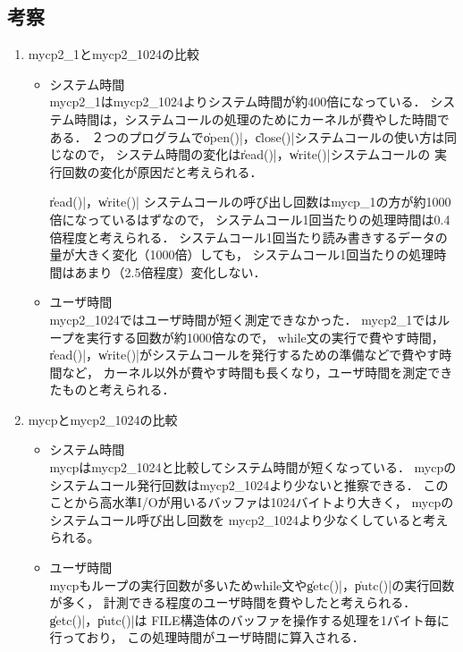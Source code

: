 \documentclass[a4j,twcolumn,11pt,nomag]{ltjarticle}      %
\begin{document}
\subsection*{考察}
\begin{enumerate}
  \item mycp2\_1とmycp2\_1024の比較
  \begin{itemize}
   \item システム時間 \\
   mycp2\_1はmycp2\_1024よりシステム時間が約400倍になっている．
   システム時間は，システムコールの処理のためにカーネルが費やした時間である．
   ２つのプログラムで\|open()|，\|close()|システムコールの使い方は同じなので，
   システム時間の変化は\|read()|，\|write()|システムコールの
   実行回数の変化が原因だと考えられる．

   \|read()|，\|write()|
   システムコールの呼び出し回数はmycp\_1の方が約1000倍になっているはずなので，
   システムコール1回当たりの処理時間は0.4倍程度と考えられる．
   システムコール1回当たり読み書きするデータの量が大きく変化（1000倍）しても，
   システムコール1回当たりの処理時間はあまり（2.5倍程度）変化しない．

   \item ユーザ時間 \\
   mycp2\_1024ではユーザ時間が短く測定できなかった．
   mycp2\_1ではループを実行する回数が約1000倍なので，
   while文の実行で費やす時間，
   \|read()|，\|write()|がシステムコールを発行するための準備などで費やす時間など，
   カーネル以外が費やす時間も長くなり，ユーザ時間を測定できたものと考えられる．
  \end{itemize}

  \item mycpとmycp2\_1024の比較
  \begin{itemize}
   \item システム時間 \\
   mycpはmycp2\_1024と比較してシステム時間が短くなっている．
   mycpのシステムコール発行回数はmycp2\_1024より少ないと推察できる．
   このことから高水準I/Oが用いるバッファは1024バイトより大きく，
   mycpのシステムコール呼び出し回数を
   mycp2\_1024より少なくしていると考えられる。

   \item ユーザ時間 \\
   mycpもループの実行回数が多いためwhile文や\|getc()|，\|putc()|の実行回数が多く，
   計測できる程度のユーザ時間を費やしたと考えられる．
   \|getc()|，\|putc()|は
   FILE構造体のバッファを操作する処理を1バイト毎に行っており，
   この処理時間がユーザ時間に算入される．
  \end{itemize}


\end{enumerate}
\end{document}
